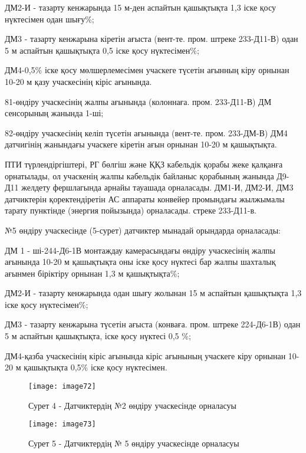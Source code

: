 \begin{multicols}{2}
ДМ2-И - тазарту кенжарында 15 м-ден аспайтын қашықтықта 1,3 іске қосу
нүктесімен одан шығу\%;

ДМ3 - тазарту кенжарына кіретін ағыста (вент-те. пром. штреке 233-Д11-В)
одан 5 м аспайтын қашықтықта 0,5 іске қосу нүктесімен\%;

ДМ4-0,5\% іске қосу мөлшерлемесімен учаскеге түсетін ағынның кіру
орнынан 10-20 м қазу учаскесінің кіріс ағынында.

81-өндіру учаскесінің жалпы ағынында (колоннаға. пром. 233-Д11-В) ДМ
сенсорының жанында 1-ші;

82-өндіру учаскесінің келіп түсетін ағынында (вент-те. пром. 233-ДМ-В)
ДМ4 датчигінің жанындағы учаскеге кіретін ағын орнынан 10-20 м
қашықтықта.

ПТИ түрлендіргіштері, РГ бөлгіш және ҚҚЗ кабельдік қорабы жеке қалқанға
орнатылады, ол учаскенің жалпы кабельдік байланыс қорабының жанында
Д9-Д11 желдету фершлагында арнайы тауашада орналасады. ДМ1-И, ДМ2-И, ДМ3
датчиктерін қоректендіретін АС аппараты конвейер промындағы жылжымалы
тарату пунктінде (энергия пойызында) орналасады. стреке 233-Д11-в.

№5 өндіру учаскесінде (5-сурет) датчиктер мынадай орындарда орналасады:

ДМ 1 - ші-244-Д6-1В монтаждау камерасындағы өндіру учаскесінің жалпы
ағынында 10-20 м қашықтықта оны іске қосу нүктесі бар жалпы шахталық
ағынмен біріктіру орнынан 1,3 м қашықтықта\%;

ДМ2-И - тазарту кенжарында одан шығу жолынан 15 м аспайтын қашықтықта
1,3 іске қосу нүктесімен\%;

ДМ3 - тазарту кенжарына түсетін ағыста (конваға. пром. штреке 224-Д6-1В)
одан 5 м аспайтын қашықтықта, іске қосу нүктесі 0,5 \%;

ДМ4-қазба учаскесінің кіріс ағынында кіріс ағынының учаскеге кіру
орнынан 10-20 м қашықтықта 0,5\% іске қосу нүктесімен.
\end{multicols}

\begin{figure}[H]
    \centering
    \texttt{[image: image72]}
    \caption*{Сурет 4 - Датчиктердің №2 өндіру учаскесінде орналасуы}
\end{figure}
\begin{figure}[H]
    \centering
    \texttt{[image: image73]}
    \caption*{Сурет 5 - Датчиктердің № 5 өндіру учаскесінде орналасуы}
\end{figure}

